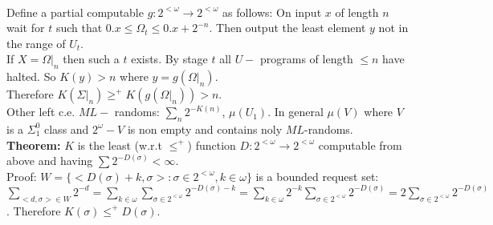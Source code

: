 \documentclass{article}
\begin{document}
		\\ Define a partial computable $g: 2^{<\omega} \to 2^{< \omega}$ as follows: On input $x$ of length $n$ wait for $t$ such that $0.x \leq \Omega_t \leq 0.x + 2^{-n}$. Then output the least element $y$ not in the range of $U_t$.\\
		If $X = \Omega|_n$ then such a $t$ exists. By stage $t$ all $U-$ programs of length $\leq n$ have halted. So $K(y) > n$ where $y = g(\Omega|_n)$.\\
		Therefore $K(\Sigma|_n) \geq^+ K(g(\Omega|_n))> n$.\\
		Other left c.e. $ML-$ randoms: $\sum_n 2^{-K(n)}$, $\mu(U_1)$. In general $\mu(V)$ where $V$ is a $\Sigma^0_1$ class and $2^\omega - V$ is non empty and contains noly $ML$-randoms.\\
		\textbf{Theorem:} $K$ is the least (w.r.t $\leq^+$) function $D: 2^{<\omega} \to 2^{<\omega}$ computable from above and having $\sum 2^{-D(\sigma)} < \infty$.\\
		Proof: $W = \{<D(\sigma)+k,\sigma> : \sigma \in 2^{<\omega}, k \in \omega\}$ is a bounded request set: $\sum_{<d,\sigma> \in W} 2^{-d} = \sum_{k\in \omega} \sum_{\sigma \in 2^{<\omega} }2^{-D(\sigma)-k}= \sum_{k\in \omega} 2^{-k} \sum_{\sigma \in 2^{<\omega}} 2^{-D(\sigma)} = 2 \sum_{\sigma \in 2^{<\omega}} 2^{-D(\sigma)}$. Therefore $K(\sigma) \leq^+ D(\sigma)$.
	\newpage
\end{document}
